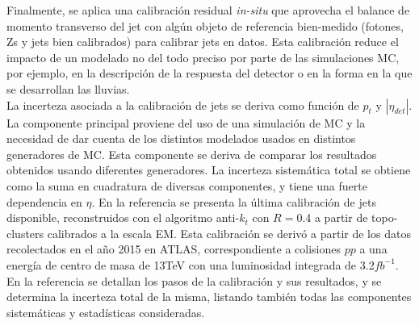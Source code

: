 Finalmente, se aplica una calibración residual \textit{in-situ} que aprovecha el balance de momento transverso del jet con algún objeto de referencia bien-medido (fotones, Zs y jets bien calibrados) para calibrar jets en datos. Esta calibración reduce el impacto de un modelado no del todo preciso por parte de las simulaciones MC, por ejemplo, en la descripción de la respuesta del detector o en la forma en la que se desarrollan las lluvias.\\

La incerteza asociada a la calibración de jets se deriva como función de $p_t$ y $|\eta_{det}|$. La componente principal proviene del uso de una simulación de MC y la necesidad de dar cuenta de los distintos modelados usados en distintos generadores de MC. Esta componente se deriva de comparar los resultados obtenidos usando diferentes generadores. La incerteza sistemática total se obtiene como la suma en cuadratura de diversas componentes, y tiene una fuerte dependencia en $\eta$. En la referencia \cite{JESpaper} se presenta la última calibración de jets disponible, reconstruidos con el algoritmo anti-$k_t$ con $R=$0.4 a partir de topo-clusters calibrados a la escala EM. Esta calibración se derivó a partir de los datos recolectados en el año 2015 en ATLAS, correspondiente a colisiones $pp$ a una energía de centro de masa de 13TeV con una luminosidad integrada de 3.2$fb^{-1}$. En la referencia se detallan los pasos de la calibración y sus resultados, y se determina la incerteza total de la misma, listando también todas las componentes sistemáticas y estadísticas consideradas.


